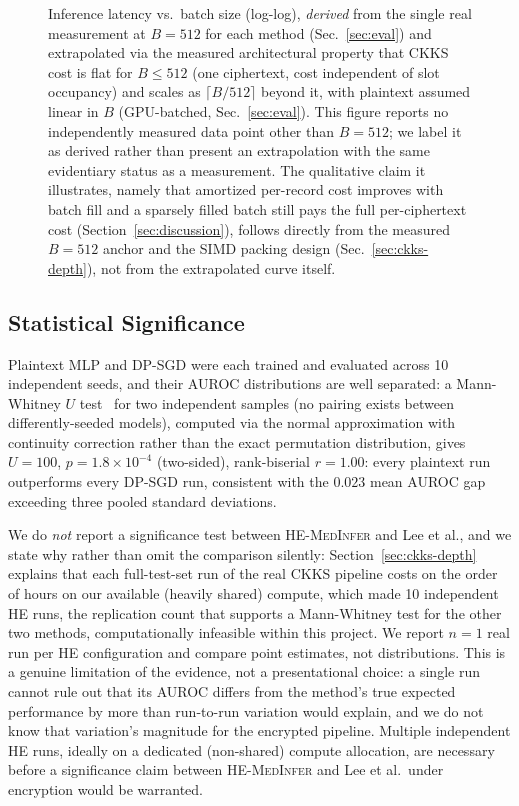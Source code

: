 \documentclass[journal,compsoc]{IEEEtran}
\newcommand{\framework}{\textsc{HE-MedInfer}}
\begin{document}
\begin{figure}[!t]
\caption{Inference latency vs.\ batch size (log-log), \emph{derived} from the
single real measurement at $B=512$ for each method (Sec.~\ref{sec:eval}) and
extrapolated via the measured architectural property that CKKS cost is flat
for $B \leq 512$ (one ciphertext, cost independent of slot occupancy) and
scales as $\lceil B/512 \rceil$ beyond it, with plaintext assumed linear in
$B$ (GPU-batched, Sec.~\ref{sec:eval}). This figure reports no independently measured
data point other than $B=512$; we label it as derived rather than present an
extrapolation with the same evidentiary status as a measurement. The
qualitative claim it illustrates, namely that amortized per-record cost
improves with batch fill and a sparsely filled batch still pays the full
per-ciphertext cost (Section~\ref{sec:discussion}), follows directly from the
measured $B=512$ anchor and the SIMD packing design
(Sec.~\ref{sec:ckks-depth}), not from the extrapolated curve itself.}
\label{fig:scalability}

\end{figure}

\subsection{Statistical Significance}

Plaintext MLP and DP-SGD were each trained and evaluated across 10
independent seeds, and their AUROC distributions are well separated: a
Mann-Whitney $U$ test~\cite{mann1947test} for two independent samples (no
pairing exists between differently-seeded models), computed via the normal
approximation with continuity correction rather than the exact permutation
distribution, gives $U = 100$,
$p = 1.8 \times 10^{-4}$ (two-sided), rank-biserial $r = 1.00$: every
plaintext run outperforms every DP-SGD run, consistent with the
$0.023$ mean AUROC gap exceeding three pooled standard deviations.

We do \emph{not} report a significance test between \framework{} and Lee et
al., and we state why rather than omit the comparison silently:
Section~\ref{sec:ckks-depth} explains that each full-test-set run of the real
CKKS pipeline costs on the order of hours on our available (heavily
shared) compute, which made 10 independent HE runs, the replication count
that supports a Mann-Whitney test for the other two methods, computationally
infeasible within this project. We report $n=1$ real run per HE configuration
and compare point estimates, not distributions. This is a genuine limitation
of the evidence, not a presentational choice: a single run cannot rule out
that its AUROC differs from the method's true expected performance by more
than run-to-run variation would explain, and we do not know that
variation's magnitude for the encrypted pipeline. Multiple independent HE
runs, ideally on a dedicated (non-shared) compute allocation, are necessary
before a significance claim between \framework{} and Lee et al.\ under
encryption would be warranted.
\end{document}
